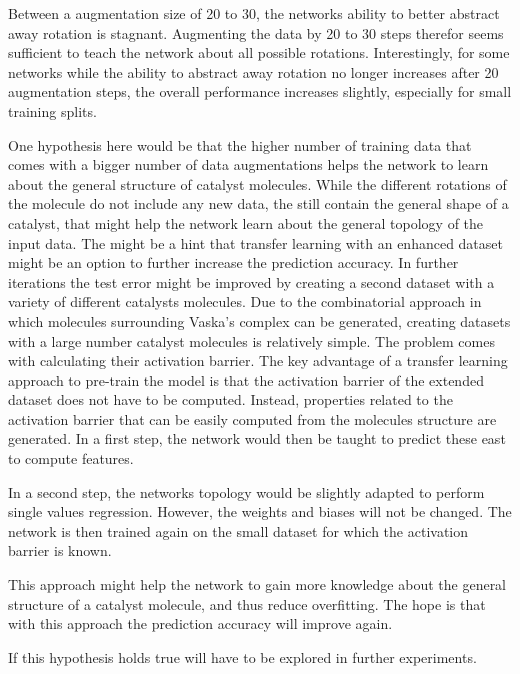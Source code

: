 Between a augmentation size of 20 to 30, the networks ability to better abstract away rotation is stagnant.
Augmenting the data by 20 to 30 steps therefor seems sufficient to teach the network about all possible rotations.
Interestingly, for some networks while the ability to abstract away rotation no longer increases after 20 augmentation 
steps, the overall performance increases slightly, especially for small training splits.

One hypothesis here would be that the higher number of training data that comes with a bigger number of data augmentations
helps the network to learn about the general structure of catalyst molecules.
While the different rotations of the molecule do not include any new data, the still contain the 
general shape of a catalyst, that might help the network learn about the general topology of the input data.
The might be a hint that transfer learning with an enhanced dataset might be an option to further increase
the prediction accuracy.
In further iterations the test error might be improved by creating a second dataset with a variety of different catalysts molecules.
Due to the combinatorial approach in which molecules surrounding Vaska's complex can be generated, 
creating datasets with a large number catalyst molecules is relatively simple.
The problem comes with calculating their activation barrier.
The key advantage of a transfer learning approach to pre-train the model is that the activation barrier of the extended dataset does not have to be computed.
Instead, properties related to the activation barrier that can be easily computed from the molecules structure are generated.
In a first step, the network would then be taught to predict these east to compute features.

In a second step, the networks topology would be slightly adapted to perform single values regression.
However, the weights and biases will not be changed.
The network is then trained again on the small dataset for which the activation barrier is known.

This approach might help the network to gain more knowledge about the general structure of a catalyst molecule,
and thus reduce overfitting.
The hope is that with this approach the prediction accuracy will improve again.

If this hypothesis holds true will have to be explored in further experiments.


